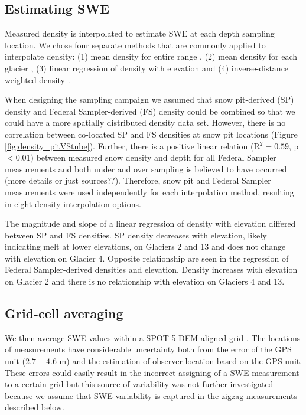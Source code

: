 \documentclass[twocolumn,letterpaper]{igs}
\begin{document}
\subsection{Estimating SWE}

Measured density is interpolated to estimate SWE at each depth sampling location. We chose four separate methods that are commonly applied to interpolate density: (1) mean density for entire range \citep{Cullen2017}, (2) mean density for each glacier \citep{Elder1991, McGrath2015}, (3) linear regression of density with elevation \citep{Elder1998, Molotch2005} and (4) inverse-distance weighted density \citep{Molotch2005}. 

When designing the sampling campaign we assumed that snow pit-derived (SP) density and Federal Sampler-derived (FS) density could be combined so that we could have a more spatially distributed density data set. However, there is no correlation between co-located SP and FS densities at snow pit locations (Figure \ref{fig:density_pitVStube}). Further, there is a positive linear relation (R$^2= 0.59$, p$<$0.01) between measured snow density
and depth for all Federal Sampler measurements and both under and over sampling is believed to have occurred (more details or just sources??). Therefore, snow pit and Federal Sampler measurements were used independently for each interpolation method, resulting in eight density interpolation options. 

The magnitude and slope of a linear regression of density with elevation differed between
SP and FS densities. SP density decreases with elevation, likely indicating melt at lower elevations, on Glaciers 2 and 13 and does not change with elevation on Glacier 4. Opposite relationship are seen in the regression of Federal Sampler-derived densities and elevation. Density increases with elevation on Glacier 2 and there is no relationship with elevation on Glaciers 4 and 13. 

\subsection{Grid-cell averaging}

We then average SWE values within a SPOT-5 DEM-aligned grid \citep{Korona2009}. The locations of measurements have considerable uncertainty both from the error of the GPS unit ($2.7 - 4.6$ m) and the estimation of observer location based on the GPS unit. These errors could easily result in the incorrect assigning of a SWE measurement to a certain grid but this source of variability was not further investigated because we assume that SWE variability is captured in the zigzag measurements described below. 
\end{document}

